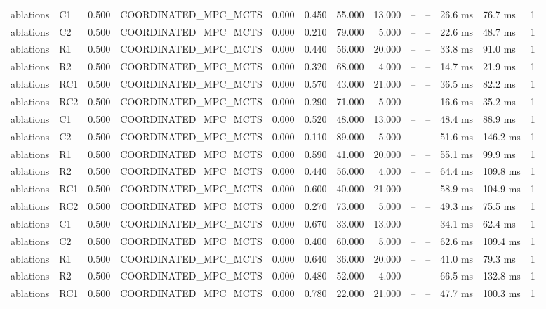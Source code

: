 \begin{table}
{\begin{tabular}{llrlrrrrrrllr}
ablations & C1 & 0.500 & COORDINATED\_MPC\_MCTS & 0.000 & 0.450 & 55.000 & 13.000 & -- & -- & 26.6 ms & 76.7 ms & 1 \\
ablations & C2 & 0.500 & COORDINATED\_MPC\_MCTS & 0.000 & 0.210 & 79.000 & 5.000 & -- & -- & 22.6 ms & 48.7 ms & 1 \\
ablations & R1 & 0.500 & COORDINATED\_MPC\_MCTS & 0.000 & 0.440 & 56.000 & 20.000 & -- & -- & 33.8 ms & 91.0 ms & 1 \\
ablations & R2 & 0.500 & COORDINATED\_MPC\_MCTS & 0.000 & 0.320 & 68.000 & 4.000 & -- & -- & 14.7 ms & 21.9 ms & 1 \\
ablations & RC1 & 0.500 & COORDINATED\_MPC\_MCTS & 0.000 & 0.570 & 43.000 & 21.000 & -- & -- & 36.5 ms & 82.2 ms & 1 \\
ablations & RC2 & 0.500 & COORDINATED\_MPC\_MCTS & 0.000 & 0.290 & 71.000 & 5.000 & -- & -- & 16.6 ms & 35.2 ms & 1 \\
ablations & C1 & 0.500 & COORDINATED\_MPC\_MCTS & 0.000 & 0.520 & 48.000 & 13.000 & -- & -- & 48.4 ms & 88.9 ms & 1 \\
ablations & C2 & 0.500 & COORDINATED\_MPC\_MCTS & 0.000 & 0.110 & 89.000 & 5.000 & -- & -- & 51.6 ms & 146.2 ms & 1 \\
ablations & R1 & 0.500 & COORDINATED\_MPC\_MCTS & 0.000 & 0.590 & 41.000 & 20.000 & -- & -- & 55.1 ms & 99.9 ms & 1 \\
ablations & R2 & 0.500 & COORDINATED\_MPC\_MCTS & 0.000 & 0.440 & 56.000 & 4.000 & -- & -- & 64.4 ms & 109.8 ms & 1 \\
ablations & RC1 & 0.500 & COORDINATED\_MPC\_MCTS & 0.000 & 0.600 & 40.000 & 21.000 & -- & -- & 58.9 ms & 104.9 ms & 1 \\
ablations & RC2 & 0.500 & COORDINATED\_MPC\_MCTS & 0.000 & 0.270 & 73.000 & 5.000 & -- & -- & 49.3 ms & 75.5 ms & 1 \\
ablations & C1 & 0.500 & COORDINATED\_MPC\_MCTS & 0.000 & 0.670 & 33.000 & 13.000 & -- & -- & 34.1 ms & 62.4 ms & 1 \\
ablations & C2 & 0.500 & COORDINATED\_MPC\_MCTS & 0.000 & 0.400 & 60.000 & 5.000 & -- & -- & 62.6 ms & 109.4 ms & 1 \\
ablations & R1 & 0.500 & COORDINATED\_MPC\_MCTS & 0.000 & 0.640 & 36.000 & 20.000 & -- & -- & 41.0 ms & 79.3 ms & 1 \\
ablations & R2 & 0.500 & COORDINATED\_MPC\_MCTS & 0.000 & 0.480 & 52.000 & 4.000 & -- & -- & 66.5 ms & 132.8 ms & 1 \\
ablations & RC1 & 0.500 & COORDINATED\_MPC\_MCTS & 0.000 & 0.780 & 22.000 & 21.000 & -- & -- & 47.7 ms & 100.3 ms & 1 \\

\end{tabular}}
\end{table}
